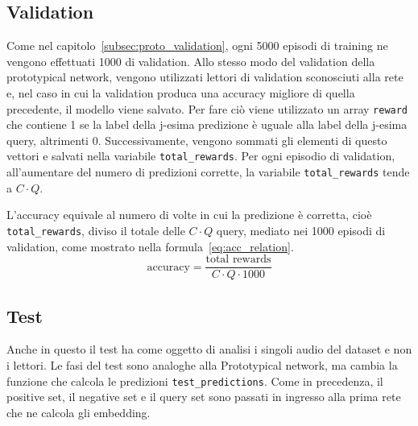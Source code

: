 \documentclass[12pt,a4paper,titlepage]{article}
\begin{document}
\subsection{Validation}
Come nel capitolo~\ref{subsec:proto_validation}, ogni 5000 episodi di training ne vengono effettuati 1000 di validation. Allo stesso modo del validation della prototypical network, vengono utilizzati lettori di validation sconosciuti alla rete e, nel caso in cui la validation produca una accuracy migliore di quella precedente, il modello viene salvato.
Per fare ciò viene utilizzato un array \texttt{reward} che contiene 1 se la label della j-esima predizione è uguale alla label della j-esima query, altrimenti 0. Successivamente, vengono sommati gli elementi di questo vettori e salvati nella variabile \texttt{total\_rewards}. Per ogni episodio di validation, all'aumentare del numero di predizioni corrette, la variabile \texttt{total\_rewards} tende a $C \cdot Q$.

L'accuracy equivale al numero di volte in cui la predizione è corretta, cioè \texttt{total\_rewards}, diviso il totale delle $C \cdot Q$ query, mediato nei 1000 episodi di validation, come mostrato nella formula~\eqref{eq:acc_relation}.
\begin{equation}\label{eq:acc_relation}
\text{accuracy} = \dfrac{\text{total rewards}}{C \cdot Q \cdot 1000}
\end{equation}
\subsection{Test}
Anche in questo il test ha come oggetto di analisi i singoli audio del dataset e non i lettori. Le fasi del test sono analoghe alla Prototypical network, ma cambia la funzione che calcola le predizioni \texttt{test\_predictions}.
Come in precedenza, il positive set, il negative set e il query set sono passati in ingresso alla prima rete che ne calcola gli embedding.
\end{document}
